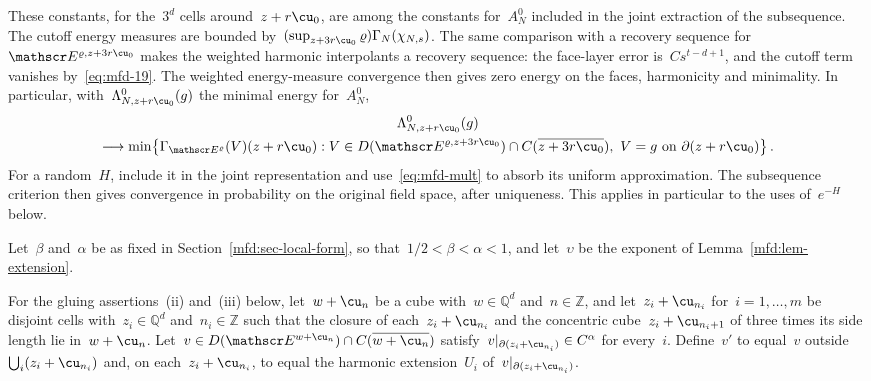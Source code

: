 \documentclass[11pt]{amsart}
\begin{document}
\smallskip

These constants, for the~$3^d$ cells around~$z+r\cu_0$, are among the constants for~$A_N^0$ included in the joint extraction of the subsequence. The cutoff energy measures are bounded by~$(\sup_{z+3r\cu_0}\varrho)\Gamma_N(\chi_{N,s})$. The same comparison with a recovery sequence for~$\mathscr E^{\varrho,z+3r\cu_0}$ makes the weighted harmonic interpolants a recovery sequence: the face-layer error is~$Cs^{t-d+1}$, and the cutoff term vanishes by~\eqref{eq:mfd-19}. The weighted energy-measure convergence then gives zero energy on the faces, harmonicity and minimality. In particular, with~$\Lambda^0_{N,z+r\cu_0}(g)$ the minimal energy for~$A_N^0$,
\begin{multline}
	\Lambda_{N,z+r\cu_0}^0(g) \\
	\longrightarrow\min\bigl\{\Gamma_{\mathscr E^\varrho}(V)(z+r\cu_0):
	V\in D(\mathscr E^{\varrho,z+3r\cu_0})\cap C(\overline{z+3r\cu_0}),\ V=g\text{ on }\partial(z+r\cu_0)\bigr\}\,.
	\label{eq:mfd-weighted-boundary-minimum}
\end{multline}
For a random~$H$, include it in the joint representation and use~\eqref{eq:mfd-mult} to absorb its uniform approximation. The subsequence criterion then gives convergence in probability on the original field space, after uniqueness. This applies in particular to the uses of~$e^{-H}$ below.

Let~$\beta$ and~$\alpha$ be as fixed in Section~\ref{mfd:sec-local-form}, so that~$1/2<\beta<\alpha<1$, and let~$\upsilon$ be the exponent of Lemma~\ref{mfd:lem-extension}.

For the gluing assertions~(ii) and~(iii) below, let~$w+\cu_n$ be a cube with~$w\in\mathbb Q^d$ and~$n\in\mathbb Z$, and let~$z_i+\cu_{n_i}$ for~$i=1,\dots,m$ be disjoint cells with~$z_i\in\mathbb Q^d$ and~$n_i\in\mathbb Z$ such that the closure of each~$z_i+\cu_{n_i}$ and the concentric cube~$z_i+\cu_{n_i+1}$ of three times its side length lie in~$w+\cu_n$. Let~$v\in D(\mathscr E^{w+\cu_n})\cap C(\overline{w+\cu_n})$ satisfy~$v|_{\partial(z_i+\cu_{n_i})}\in C^\alpha$ for every~$i$. Define~$v'$ to equal~$v$ outside~$\bigcup_i(z_i+\cu_{n_i})$ and, on each~$z_i+\cu_{n_i}$, to equal the harmonic extension~$U_i$ of~$v|_{\partial(z_i+\cu_{n_i})}$.
\end{document}
